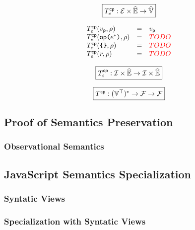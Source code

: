 \[
  \framebox{$\cptransforme: \exprset \times \senvset \rightarrow \svalset$}
\]

\[
  \begin{array}{lcl}
    T^{\textsf{cp}}_e(v_{\textsf{p}}, \rho) &=& v_{\textsf{p}}\\
    T^{\textsf{cp}}_e(\textsf{op} \texttt{(} e^* \texttt{)}, \rho) &=& {\color{red}{TODO}}\\
    T^{\textsf{cp}}_e(\texttt{\{} \texttt{\}}, \rho) &=& {\color{red}{TODO}}\\
    T^{\textsf{cp}}_e(r, \rho) &=& {\color{red}{TODO}}\\
  \end{array}
\]

\[
  \framebox{$\cptransformi: \instset \times \senvset \rightarrow \instset \times
  \senvset$}
\]

\todo

\[
  \framebox{$\cptransform: (\valoptset)^* \rightarrow \funcset \rightarrow
  \funcset$}
\]

\todo





% 
% 
% 
% 








\subsection{Proof of Semantics Preservation}

\todo

\subsubsection{Observational Semantics}

\todo





\subsection{JavaScript Semantics Specialization}

\todo

\subsubsection{Syntatic Views}

\todo

\subsubsection{Specialization with Syntatic Views}

\todo
